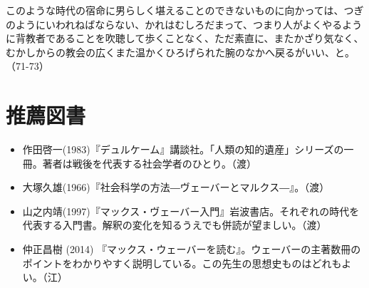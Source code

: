 このような時代の宿命に男らしく堪えることのできないものに向かっては、つぎのようにいわれねばならない、かれはむしろだまって、つまり人がよくやるように背教者であることを吹聴して歩くことなく、ただ素直に、またかざり気なく、むかしからの教会の広くまた温かくひろげられた腕のなかへ戻るがいい、と。（71-73）


\vspace{2zw}
\section{推薦図書}




\begin{itemize}
\item 作田啓一(1983)『デュルケーム』講談社。「人類の知的遺産」シリーズの一冊。著者は戦後を代表する社会学者のひとり。（渡）
\item 大塚久雄(1966)『社会科学の方法―ヴェーバーとマルクス―』。（渡）
\item 山之内靖(1997)『マックス・ヴェーバー入門』岩波書店。それぞれの時代を代表する入門書。解釈の変化を知るうえでも併読が望ましい。（渡）
\item 仲正昌樹 (2014) 『マックス・ウェーバーを読む』。ウェーバーの主著数冊のポイントをわかりやすく説明している。この先生の思想史ものはどれもよい。（江）
\end{itemize}



